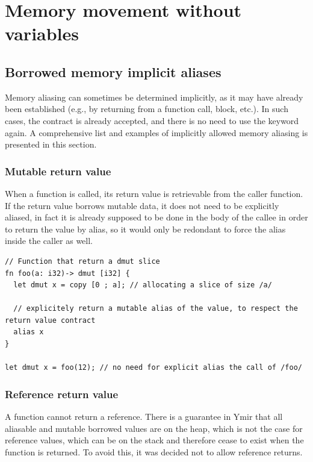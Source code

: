 \section {Memory movement without variables}%
\label{sec:memory_movement}

\subsection{Borrowed memory implicit aliases}

Memory aliasing can sometimes be determined implicitly, as it may have already
been established (e.g., by returning from a function call, block, etc.). In such
cases, the contract is already accepted, and there is no need to use the keyword
 again. A comprehensive list and examples of implicitly allowed
memory aliasing is presented in this section.

\subsubsection*{Mutable return value}

When a function is called, its return value is retrievable from the caller
function. If the return value borrows mutable data, it does not need to be
explicitly aliased, in fact it is already supposed to be done in the body of the
callee in order to return the value by alias, so it would only be redondant to
force the alias inside the caller as well.

\begin{lstlisting}[style=coloredverbatim]
// Function that return a dmut slice
fn foo(a: i32)-> dmut [i32] {
  let dmut x = copy [0 ; a]; // allocating a slice of size /a/

  // explicitely return a mutable alias of the value, to respect the return value contract
  alias x
}

let dmut x = foo(12); // no need for explicit alias the call of /foo/
\end{lstlisting}

\subsubsection*{Reference return value}

A function cannot return a reference. There is a guarantee in Ymir that all
aliasable and mutable borrowed values are on the heap, which is not the case for
reference values, which can be on the stack and therefore cease to exist when
the function is returned. To avoid this, it was decided not to allow reference
returns.

